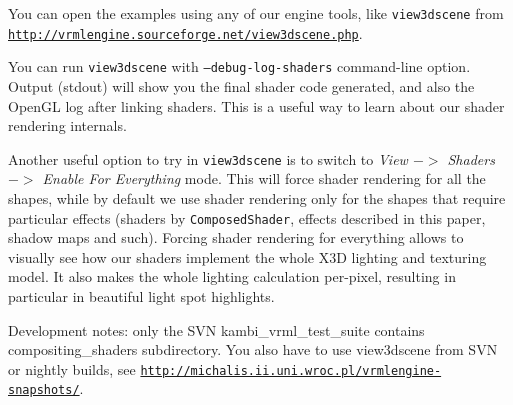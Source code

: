 \documentclass{acmsiggraph}                     %
\newcommand*{\myhref}[2]{\texttt{\href{#1}{\nolinkurl{#2}}}}
\begin{document}
You can open the examples using any of our engine tools,
like \texttt{view3dscene} from
\myhref{http://vrmlengine.sourceforge.net/view3dscene.php}{http://vrmlengine.sourceforge.net/view3dscene.php}.

You can run \texttt{view3dscene} with \texttt{--debug-log-shaders} command-line
option. Output (stdout) will show you the final shader code generated,
and also the OpenGL log after linking shaders.
This is a useful way to learn about our shader rendering internals.

Another useful option to try in \texttt{view3dscene} is to switch to
\textit{View $->$ Shaders $->$ Enable For Everything} mode.
This will force shader rendering for all the shapes,
while by default we use shader rendering only for the shapes that
require particular effects (shaders by \texttt{ComposedShader}, effects
described in this paper, shadow maps and such).
Forcing shader rendering for everything allows to visually see
how our shaders implement the whole X3D lighting and texturing model.
It also makes the whole lighting calculation per-pixel, resulting
in particular in beautiful light spot highlights.

Development notes: only the SVN kambi\_vrml\_test\_suite contains
compositing\_shaders subdirectory.
You also have to use view3dscene from SVN or nightly builds,
see \myhref{http://michalis.ii.uni.wroc.pl/vrmlengine-snapshots/}{http://michalis.ii.uni.wroc.pl/vrmlengine-snapshots/}.


\nocite{*}

\end{document}
